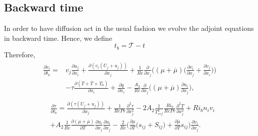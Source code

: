 \documentclass[preprint,12pt]{article}
\begin{document}
\subsection{Backward time}
In order to have diffusion act in the usual fashion we evolve the adjoint equations in backward time. Hence, we define
\begin{equation}
t_b=\mathcal{T}-t
\end{equation}
Therefore,
\begin{align}\begin{split}
\frac{\partial v_i}{\partial t_b}=&v_j\frac{\partial u_j}{\partial x_i}+\frac{\partial (v_i(U_j+u_j))}{\partial x_j}+\frac{1}{Re}\frac{\partial}{\partial x_j}\Big(({\mu}+\overline{\mu})\Big(\frac{\partial v_i}{\partial x_j}+\frac{\partial v_j}{\partial x_i}\Big)\Big)\\&-\tau\frac{\partial (T+\overline{T}+T_0)}{\partial x_i}+\frac{\partial q}{\partial x_i}-\frac{A_2}{Re}\frac{\partial}{\partial x_j}\Big((\mu+\overline{\mu})\frac{\partial u_i}{\partial x_j}\Big),
\end{split}
\end{align}
\begin{align}\begin{split}
&\frac{\partial \tau}{\partial t_b}=\frac{\partial(\tau(U_j+u_j))}{\partial x_j}+\frac{1}{RePr}\frac{\partial^2\tau}{\partial x_j^2}-2A_2\frac{1}{T_{ref}^2}\frac{Ri_b}{Re Pr}\frac{\partial^2 T}{\partial x_j^2}+Ri_bn_iv_i\\&+A_2\frac{1}{Re}\frac{\partial (\mu+\overline{\mu})}{\partial T}\frac{\partial u_{i}}{\partial x_j}\frac{\partial u_{i}}{\partial x_j}-\frac{2}{Re}\Big(\frac{\partial\mu}{\partial T}\big(s_{ij}+S_{ij}\big)+\frac{\partial\bar{\mu}}{\partial T}s_{ij}\Big)\frac{\partial v_i}{\partial x_j}.
\end{split}
\end{align}
\end{document}
